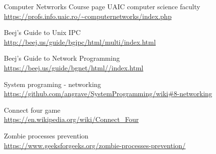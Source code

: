 \documentclass{article}
\begin{document}
\begin{thebibliography}{9}
  Computer Netwrorks Course page UAIC computer science faculty\\
  \url{https://profs.info.uaic.ro/~computernetworks/index.php}

  Beej's Guide to Unix IPC\\
  \url{http://beej.us/guide/bgipc/html/multi/index.html}
  
  Beej's Guide to Network Programming\\
  \url{https://beej.us/guide/bgnet/html//index.html}
  
  System programing - networking\\
  \url{https://github.com/angrave/SystemProgramming/wiki#8-networking}

  Connect four game\\
  \url{https://en.wikipedia.org/wiki/Connect_Four}  

  Zombie processes prevention\\
  \url{https://www.geeksforgeeks.org/zombie-processes-prevention/}  
  
\end{thebibliography}  
\end{document}
